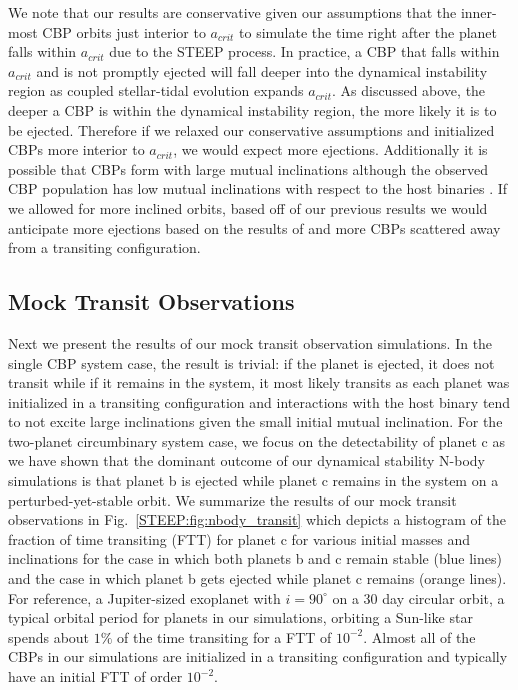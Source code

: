 We note that our results are conservative given our assumptions that the inner-most CBP orbits just interior to $a_{crit}$ to simulate the time right after the planet falls within $a_{crit}$ due to the STEEP process. In practice, a CBP that falls within $a_{crit}$ and is not promptly ejected will fall deeper into the dynamical instability region as coupled stellar-tidal evolution expands $a_{crit}$.  As discussed above, the deeper a CBP is within the dynamical instability region, the more likely it is to be ejected.  Therefore if we relaxed our conservative assumptions and initialized CBPs more interior to $a_{crit}$, we would expect more ejections.  Additionally it is possible that CBPs form with large mutual inclinations although the observed CBP population has low mutual inclinations with respect to the host binaries \citep{Li2016}.  If we allowed for more inclined orbits, based off of our previous results we would anticipate more ejections based on the results of \citet{Chatterjee2008} and more CBPs scattered away from a transiting configuration.  

\subsection{Mock Transit Observations} \label{STEEP:sec:nbody_observation}

Next we present the results of our mock transit observation simulations.  In the single CBP system case, the result is trivial: if the planet is ejected, it does not transit while if it remains in the system, it most likely transits as each planet was initialized in a transiting configuration and interactions with the host binary tend to not excite large inclinations given the small initial mutual inclination.  For the two-planet circumbinary system case, we focus on the detectability of planet c as we have shown that the dominant outcome of our dynamical stability N-body simulations is that planet b is ejected while planet c remains in the system on a perturbed-yet-stable orbit.  We summarize the results of our mock transit observations in Fig.~\ref{STEEP:fig:nbody_transit} which depicts a histogram of the fraction of time transiting (FTT) for planet c for various initial masses and inclinations for the case in which both planets b and c remain stable (blue lines) and the case in which planet b gets ejected while planet c remains (orange lines).  For reference, a Jupiter-sized exoplanet with $i=90^{\circ}$ on a 30 day circular orbit, a typical orbital period for planets in our simulations, orbiting a Sun-like star spends about $1\%$ of the time transiting for a FTT of $10^{-2}$.  Almost all of the CBPs in our simulations are initialized in a transiting configuration and typically have an initial FTT of order $10^{-2}$.  


